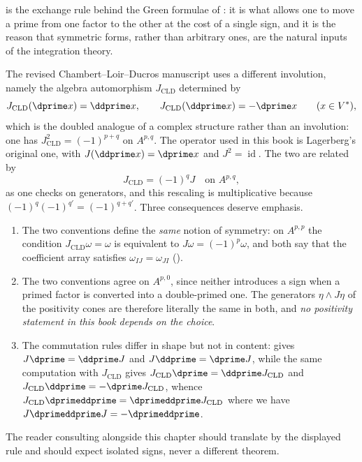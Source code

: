  is the exchange rule behind the Green
formulae of : it is what allows one to move a
prime from one factor to the other at the cost of a single sign, and it is
the reason that symmetric forms, rather than arbitrary ones, are the natural
inputs of the integration theory.

\begin{remark}
\label{rem:ch09-two-involutions}
The revised Chambert--Loir--Ducros manuscript \cite[\S1.1]{CLD25} uses a
different involution, namely the algebra automorphism $J_{\mathrm{CLD}}$
determined by
\[
 J_{\mathrm{CLD}}(\dprime x)=\ddprime x,
 \qquad
 J_{\mathrm{CLD}}(\ddprime x)=-\dprime x
 \qquad(x\in V^*),
\]
which is the doubled analogue of a complex structure rather than an
involution: one has $J_{\mathrm{CLD}}^2=(-1)^{p+q}$ on $A^{p,q}$.  The
operator used in this book is Lagerberg's original one, with
$J(\ddprime x)=\dprime x$ and $J^2=\operatorname{id}$.  The two are related
by
\[
 J_{\mathrm{CLD}}=(-1)^qJ\quad\text{on }A^{p,q},
\]
as one checks on generators, and this rescaling is multiplicative because
$(-1)^{q}(-1)^{q'}=(-1)^{q+q'}$.  Three consequences deserve emphasis.
\begin{enumerate}
\item The two conventions define the \emph{same} notion of symmetry: on
  $A^{p,p}$ the condition $J_{\mathrm{CLD}}\omega=\omega$ is equivalent to
  $J\omega=(-1)^p\omega$, and both say that the coefficient array satisfies
  $\omega_{IJ}=\omega_{JI}$ ().
\item The two conventions agree on $A^{p,0}$, since neither introduces a sign
  when a primed factor is converted into a double-primed one.  The generators
  $\eta\wedge J\eta$ of the positivity cones are therefore literally the same
  in both, and \emph{no positivity statement in this book depends on the
  choice}.
\item The commutation rules differ in shape but not in content:
   gives $J\dprime=\ddprime J$ and
  $J\ddprime=\dprime J$, while the same computation with
  $J_{\mathrm{CLD}}$ gives
  $J_{\mathrm{CLD}}\dprime=\ddprime J_{\mathrm{CLD}}$ and
  $J_{\mathrm{CLD}}\ddprime=-\dprime J_{\mathrm{CLD}}$, whence
  $J_{\mathrm{CLD}}\dprimeddprime=\dprimeddprime J_{\mathrm{CLD}}$ where we
  have $J\dprimeddprime J=-\dprimeddprime$.
\end{enumerate}
The reader consulting \cite{CLD25} alongside this chapter should translate by
the displayed rule and should expect isolated signs, never a different
theorem.
\end{remark}

